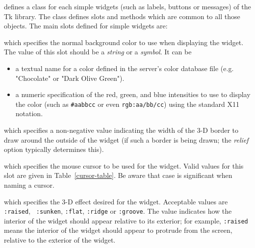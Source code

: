 {\stklos} defines a class for each simple widgets (such as labels, buttons or
messages) of the Tk library. The {\tt <Tk-simple-widget>} class defines slots
and methods which are common to all those objects. The main slots defined for
simple widgets are:
\begin {ip}
\label{background}
which specifies
the normal background color to use when displaying the widget.  The value of
this slot should be a {\em string} or a {\em symbol}. It can be 
\begin{itemize}
\item a textual name
for a color defined in the server's color database file (e.g. "Chocolate" or
"Dark Olive Green").
\item a numeric specification of the red, green, and blue intensities
to use to display the color (such as {\tt \#aabbcc} or even {\tt rgb:aa/bb/cc})
using the standard X11 notation.
\end{itemize}

\label{border-width}
which specifies a non-negative value indicating the width of the 3-D border to
draw around the outside of the widget (if such a border is being drawn; the
{\em relief} option typically determines this).

\label{cursor}
which specifies the mouse
cursor to be used for the widget. Valid values for this slot are given in
Table~\ref{cursor-table}. Be aware that case is significant when naming a cursor.

\label{relief}
which specifies the 3-D
effect desired for the widget.  Acceptable values are {\tt :raised}, {\tt
:sunken}, {\tt :flat}, {\tt :ridge} or {\tt :groove}.  The value indicates how
the interior of the widget should appear relative to its exterior; for
example, {\tt :raised} means the interior of the widget should appear to
protrude from the screen, relative to the exterior of the widget.
\end{ip}
